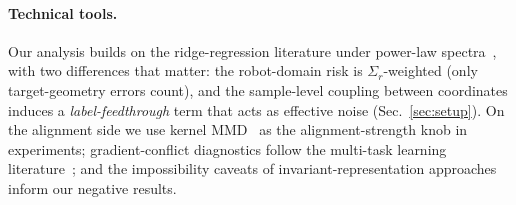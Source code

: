 \paragraph{Technical tools.}
Our analysis builds on the ridge-regression literature under power-law spectra~\cite{dobriban2018high,hastie2022surprises}, with two differences that matter: the robot-domain risk is $\Sigma_r$-weighted (only target-geometry errors count), and the sample-level coupling between coordinates induces a \emph{label-feedthrough} term that acts as effective noise (Sec.~\ref{sec:setup}).
On the alignment side we use kernel MMD~\cite{gretton2012kernel,long2015learning} as the alignment-strength knob in experiments; gradient-conflict diagnostics follow the multi-task learning literature~\cite{yu2020surgery}; and the impossibility caveats of invariant-representation approaches~\cite{zhao2019learning,arjovsky2019invariant} inform our negative results.
